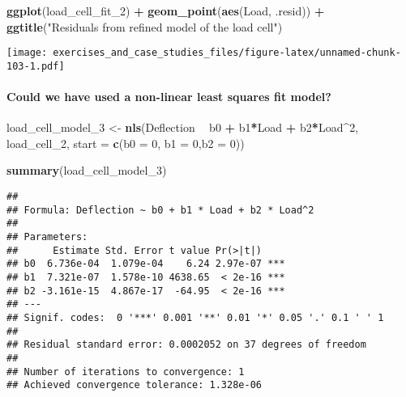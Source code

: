 \documentclass[]{book}
\newenvironment{Shaded}{\begin{snugshade}}{\end{snugshade}}
\newcommand{\DataTypeTok}[1]{\textcolor[rgb]{0.13,0.29,0.53}{#1}}
\newcommand{\DecValTok}[1]{\textcolor[rgb]{0.00,0.00,0.81}{#1}}
\newcommand{\KeywordTok}[1]{\textcolor[rgb]{0.13,0.29,0.53}{\textbf{#1}}}
\newcommand{\NormalTok}[1]{#1}
\newcommand{\OperatorTok}[1]{\textcolor[rgb]{0.81,0.36,0.00}{\textbf{#1}}}
\newcommand{\StringTok}[1]{\textcolor[rgb]{0.31,0.60,0.02}{#1}}
\let\oldparagraph\paragraph
\renewcommand{\paragraph}[1]{\oldparagraph{#1}\mbox{}}
\theoremstyle{definition}
\theoremstyle{definition}
\theoremstyle{definition}
\theoremstyle{remark}
\begin{document}
\begin{Shaded}
\begin{Highlighting}[]
\KeywordTok{ggplot}\NormalTok{(load_cell_fit_}\DecValTok{2}\NormalTok{) }\OperatorTok{+}
\StringTok{  }\KeywordTok{geom_point}\NormalTok{(}\KeywordTok{aes}\NormalTok{(Load, .resid)) }\OperatorTok{+}
\StringTok{  }\KeywordTok{ggtitle}\NormalTok{(}\StringTok{"Residuals from refined model of the load cell"}\NormalTok{)}
\end{Highlighting}
\end{Shaded}

\texttt{[image: exercises\_and\_case\_studies\_files/figure-latex/unnamed-chunk-103-1.pdf]}

\hypertarget{could-we-have-used-a-non-linear-least-squares-fit-model}{%
\paragraph{Could we have used a non-linear least squares fit
model?}\label{could-we-have-used-a-non-linear-least-squares-fit-model}}

\begin{Shaded}
\begin{Highlighting}[]
\NormalTok{load_cell_model_}\DecValTok{3}\NormalTok{ <-}\StringTok{ }\KeywordTok{nls}\NormalTok{(Deflection }\OperatorTok{~}\StringTok{ }\NormalTok{b0 }\OperatorTok{+}\StringTok{ }\NormalTok{b1}\OperatorTok{*}\NormalTok{Load }\OperatorTok{+}\StringTok{ }\NormalTok{b2}\OperatorTok{*}\NormalTok{Load}\OperatorTok{^}\DecValTok{2}\NormalTok{, load_cell_}\DecValTok{2}\NormalTok{, }\DataTypeTok{start =} \KeywordTok{c}\NormalTok{(}\DataTypeTok{b0 =} \DecValTok{0}\NormalTok{, }\DataTypeTok{b1 =} \DecValTok{0}\NormalTok{,}\DataTypeTok{b2 =} \DecValTok{0}\NormalTok{))}

\KeywordTok{summary}\NormalTok{(load_cell_model_}\DecValTok{3}\NormalTok{)}
\end{Highlighting}
\end{Shaded}

\begin{verbatim}
## 
## Formula: Deflection ~ b0 + b1 * Load + b2 * Load^2
## 
## Parameters:
##      Estimate Std. Error t value Pr(>|t|)    
## b0  6.736e-04  1.079e-04    6.24 2.97e-07 ***
## b1  7.321e-07  1.578e-10 4638.65  < 2e-16 ***
## b2 -3.161e-15  4.867e-17  -64.95  < 2e-16 ***
## ---
## Signif. codes:  0 '***' 0.001 '**' 0.01 '*' 0.05 '.' 0.1 ' ' 1
## 
## Residual standard error: 0.0002052 on 37 degrees of freedom
## 
## Number of iterations to convergence: 1 
## Achieved convergence tolerance: 1.328e-06
\end{verbatim}
\end{document}

